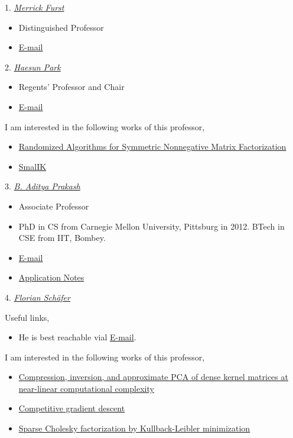 1. \href{https://www.scs.gatech.edu/people/merrick-furst}{\emph{Merrick Furst}}
\begin{itemize}
    \item Distinguished Professor
    \item \href{mailto:merrick.furst@cc.gatech.edu}{E-mail}
\end{itemize}
 

2. \href{https://faculty.cc.gatech.edu/~hpark/}{\emph{Haesun Park}}
\begin{itemize}
    \item Regents' Professor and Chair 
    \item \href{mailto:hpark@cc.gatech.edu}{E-mail}
\end{itemize}
 
I am interested in the following works of this professor,
\begin{itemize}
    \item \href{https://doi.org/10.1137/24M1638355}{Randomized Algorithms for Symmetric Nonnegative Matrix Factorization}
    \item \href{https://smallk.github.io/}{SmalIK}
\end{itemize}

3. \href{https://faculty.cc.gatech.edu/~badityap/}{\emph{B. Aditya Prakash}}
\begin{itemize}
    \item Associate Professor
    \item PhD in CS from Carnegie Mellon University, Pittsburg in 2012. BTech in CSE from IIT, Bombey.
    \item \href{mailto:badityap@cc.gatech.edu}{E-mail}
    \item \href{https://faculty.cc.gatech.edu/~badityap/applications_note.txt}{Application Notes}
\end{itemize}

4. \href{https://f-t-s.github.io/}{\emph{Florian Schäfer}}

Useful links,
\begin{itemize}
    \item He is best reachable vial \href{mailto:florian.schaefer@nyu.edu}{E-mail}.
\end{itemize}

I am interested in the following works of this professor,
\begin{itemize}
    \item \href{https://doi.org/10.1137/19M129526X}{Compression, inversion, and approximate PCA of dense kernel matrices at near-linear computational complexity}
    \item \href{http://arxiv.org/abs/1905.12103}{Competitive gradient descent}
    \item \href{http://arxiv.org/abs/2004.14455}{Sparse Cholesky factorization by Kullback-Leibler minimization}
\end{itemize}

